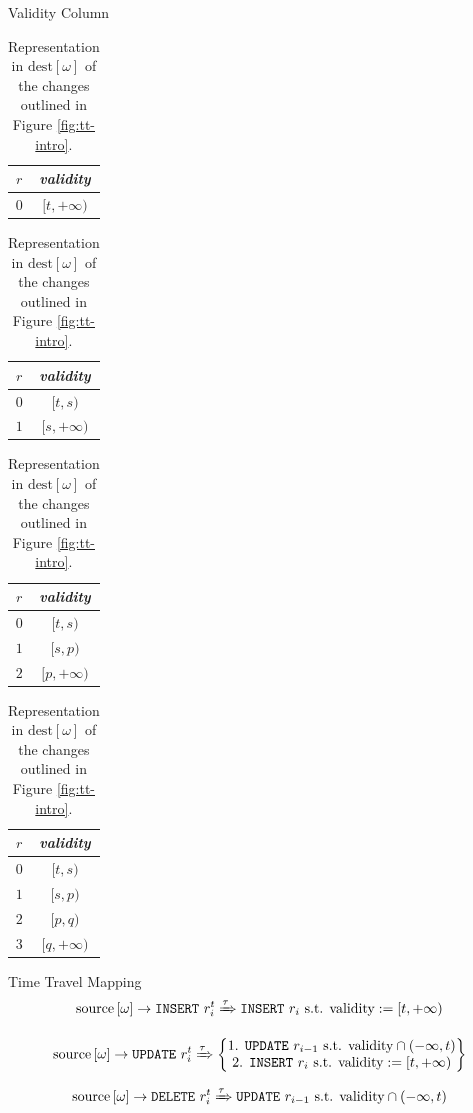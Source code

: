 \documentclass[aspectratio=169]{beamer}
\newcommand{\source}[1]{\ensuremath{\text{source}\left[{#1}\right]}}
\newcommand{\dest}[1]{\ensuremath{\text{dest}\left[{#1}\right]}}
\theoremstyle{definition}
\theoremstyle{remark}
\begin{document}
\begin{frame}{Validity Column}
	\begin{table}
		\centering
		\begin{tabular}{cc}
			$r$ & \emph{validity} \\
			\hline
			$0$ & $[t, +\infty)$ \\
		\end{tabular}
		\hspace{1mm}
		\begin{tabular}{cc}
			$r$ & \emph{validity} \\
			\hline
			$0$ & $[t, s)$ \\
			$1$ & $[s, +\infty)$ \\
		\end{tabular}
		\hspace{1mm}
		\begin{tabular}{cc}
			$r$ & \emph{validity} \\
			\hline
			$0$ & $[t, s)$ \\
			$1$ & $[s, p)$ \\
			$2$ & $[p, +\infty)$ \\
		\end{tabular}
		\hspace{1mm}
		\begin{tabular}{cc}
			$r$ & \emph{validity} \\
			\hline
			$0$ & $[t, s)$ \\
			$1$ & $[s, p)$ \\
			$2$ & $[p, q)$ \\
			$3$ & $[q, +\infty)$ \\
		\end{tabular}
		\caption{Representation in $\dest{\omega}$ of the changes outlined in Figure \ref{fig:tt-intro}.}
		\label{tab:tt-validity}
	\end{table}
\end{frame}

\begin{frame}{Time Travel Mapping}
	\begin{equation}\label{tt:insert}
		\source{\omega} \rightarrow \text{\texttt{INSERT} } r_i^t \xRightarrow{\tau}
		\text{\texttt{INSERT} } r_i \text{ s.t. } \text{validity} := [t, +\infty)
	\end{equation}
	
	\begin{equation}\label{tt:update}
		\source{\omega} \rightarrow \text{\texttt{UPDATE} } r_i^t \xRightarrow{\tau}
		\begin{Bmatrix}
			\text{1. \texttt{UPDATE} } r_{i-1} \text{ s.t. } \text{validity} \cap (-\infty, t) \\
			\text{2. \texttt{INSERT} } r_i \text{ s.t. } \text{validity} := [t, +\infty)
		\end{Bmatrix}
	\end{equation}
	
	\begin{equation}\label{tt:delete}
		\source{\omega} \rightarrow \text{\texttt{DELETE} } r_i^t \xRightarrow{\tau}
		\text{\texttt{UPDATE} } r_{i-1} \text{ s.t. } \text{validity} \cap (-\infty, t)
	\end{equation}
\end{frame}
\end{document}

